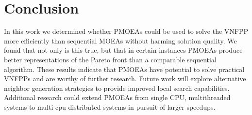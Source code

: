 \section{Conclusion}
\label{sec:conclusions}
In this work we determined whether PMOEAs could be used to solve the VNFPP more efficiently than sequential MOEAs without harming solution quality. We found that not only is this true, but that in certain instances PMOEAs produce better representations of the Pareto front than a comparable sequential algorithm. These results indicate that PMOEAs have potential to solve practical VNFPPs and are worthy of further research. Future work will explore alternative neighbor generation strategies to provide improved local search capabilities. Additional research could extend PMOEAs from single CPU, multithreaded systems to multi-cpu distributed systems in pursuit of larger speedups.